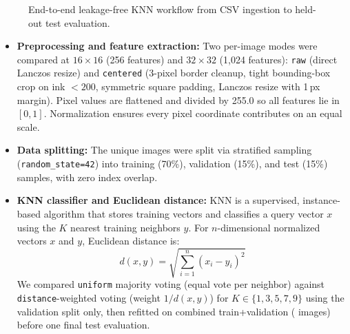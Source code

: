 \documentclass[10pt,a4paper]{article}
\begin{document}
\begin{figure}[h!]
  \centering
  \vspace{-4pt}
  \caption{End-to-end leakage-free KNN workflow from CSV ingestion to held-out test evaluation.}
  \label{fig:workflow}
\end{figure}

\begin{itemize}\itemsep1.5pt\parskip0pt
  \item \textbf{Preprocessing and feature extraction:} Two per-image modes were compared at $16\times16$ (256 features) and $32\times32$ (1,024 features): \texttt{raw} (direct Lanczos resize) and \texttt{centered} (3-pixel border cleanup, tight bounding-box crop on ink $<200$, symmetric square padding, Lanczos resize with 1\,px margin). Pixel values are flattened and divided by 255.0 so all features lie in $[0,1]$. Normalization ensures every pixel coordinate contributes on an equal scale.
  \item \textbf{Data splitting:} The \TotalUniqueImages{} unique images were split via stratified sampling (\texttt{random\_state=42}) into \textbf{\TrainCount{}} training (70\%), \textbf{\ValCount{}} validation (15\%), and \textbf{\TestCount{}} test (15\%) samples, with zero index overlap.
  \item \textbf{KNN classifier and Euclidean distance:} KNN is a supervised, instance-based algorithm that stores training vectors and classifies a query vector $x$ using the $K$ nearest training neighbors $y$. For $n$-dimensional normalized vectors $x$ and $y$, Euclidean distance is:
  \[
    d(x,y)=\sqrt{\sum_{i=1}^{n}(x_i-y_i)^2}
  \]
  We compared \texttt{uniform} majority voting (equal vote per neighbor) against \texttt{distance}-weighted voting (weight $1/d(x,y)$) for $K \in \{1,3,5,7,9\}$ using the validation split only, then refitted on combined train+validation (\RefitCount{} images) before one final test evaluation.
\end{itemize}
\end{document}
